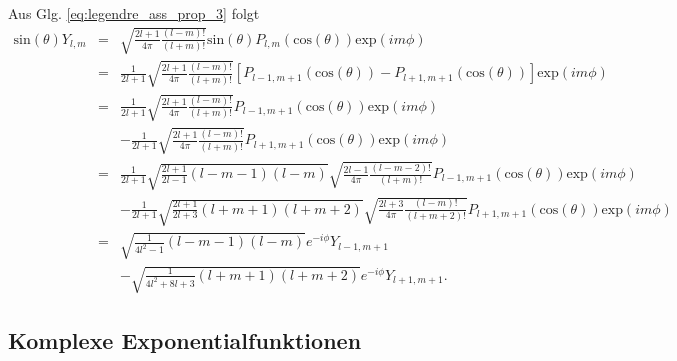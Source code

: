 \documentclass{book}
\renewcommand{\exp}{\text{exp}}
\renewcommand{\sin}{\text{sin}}
\renewcommand{\cos}{\text{cos}}
\begin{document}
%
Aus Glg. \eqref{eq:legendre_ass_prop_3} folgt
%
\begin{eqnarray}
\sin\left(\theta\right)Y_{l, m} & = & \sqrt{\frac{2l + 1}{4\pi}\frac{\left(l - m\right)!}{\left(l + m\right)!}}\sin\left(\theta\right)P_{l, m}\left(\cos\left(\theta\right)\right)\exp\left(im\phi\right)\nonumber\\
& = & \frac{1}{2l + 1}\sqrt{\frac{2l + 1}{4\pi}\frac{\left(l - m\right)!}{\left(l + m\right)!}}\left[P_{l - 1, m + 1}\left(\cos\left(\theta\right)\right) - P_{l + 1, m + 1}\left(\cos\left(\theta\right)\right)\right]\exp\left(im\phi\right)\nonumber\\
& = & \frac{1}{2l + 1}\sqrt{\frac{2l + 1}{4\pi}\frac{\left(l - m\right)!}{\left(l + m\right)!}}P_{l - 1, m + 1}\left(\cos\left(\theta\right)\right)\exp\left(im\phi\right)\nonumber\\
&& -\frac{1}{2l + 1}\sqrt{\frac{2l + 1}{4\pi}\frac{\left(l - m\right)!}{\left(l + m\right)!}}P_{l + 1, m + 1}\left(\cos\left(\theta\right)\right)\exp\left(im\phi\right)\nonumber\\
& = & \frac{1}{2l + 1}\sqrt{\frac{2l + 1}{2l - 1}\left(l - m - 1\right)\left(l - m\right)}\sqrt{\frac{2l - 1}{4\pi}\frac{\left(l - m - 2\right)!}{\left(l + m\right)!}}P_{l - 1, m + 1}\left(\cos\left(\theta\right)\right)\exp\left(im\phi\right)\nonumber\\
&& -\frac{1}{2l + 1}\sqrt{\frac{2l + 1}{2l + 3}\left(l + m + 1\right)\left(l + m + 2\right)}\sqrt{\frac{2l + 3}{4\pi}\frac{\left(l - m\right)!}{\left(l + m + 2\right)!}}P_{l + 1, m + 1}\left(\cos\left(\theta\right)\right)\exp\left(im\phi\right)\nonumber\\
& = & \sqrt{\frac{1}{4l^2 - 1}\left(l - m - 1\right)\left(l - m\right)}e^{-i\phi}Y_{l - 1, m + 1}\nonumber\\
&& -\sqrt{\frac{1}{4l^2 + 8l + 3}\left(l + m + 1\right)\left(l + m + 2\right)}e^{-i\phi}Y_{l + 1, m + 1}.\label{eq:spherical_harm_prop_3}
\end{eqnarray}

\subsection{Komplexe Exponentialfunktionen}
\label{sec:komplexe_exponentialfunktionen}
\end{document}
